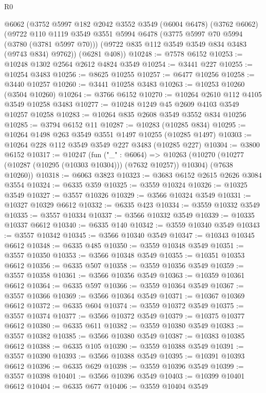 \begin{lexlean}{R0}
\begin{coremodule}
    @6062
    (@3752
      @5997
      @182
      @2042
      @3552
      @3549
      (@6004 @6478)
      (@3762 @6062)
      (@9722
        @110
        @1119
        @3549
        @3551
        @5994
        @6478
        (@3775 @5997 @70 @5994 (@3780 (@3781 @5997 @70)))
        (@9722 @835 @112 @3549 @3549 @834 @3483 (@9743 @834) @9762))
      (@6281 @408))
@10248 := @7578 @6152
@10253 := @10248 @1302 @2564 @2612 @4824 @3549
@10254 := @3441 @227
@10255 := @10254 @3483
@10256 := @8625 @10255
@10257 := @6477 @10256
@10258 := @3440 @10257
@10260 := @3441 @10258 @3483
@10263 := @10253 @10260 (@3504 @10260)
@10264 := @3766 @6152
@10270 := @10264 @2610 @112 @4105 @3549 @10258 @3483
@10277 := @10248 @1249 @45 @2609 @4103 @3549 @10257 @10258
@10283 := @10264 @835 @2608 @3549 @3552 @834 @10256
@10285 := @3794 @6152 @11
@10287 := @10283 (@10285 @834)
@10295 := @10264 @1498 @263 @3549 @3551 @1497 @10255 (@10285 @1497)
@10303 := @10264 @228 @112 @3549 @3549 @227 @3483 (@10285 @227)
@10304 := @3800 @6152
@10317 := @10247
    (fun ("_" : @6064) =>
    @10263 (@10270 (@10277 (@10287 (@10295 (@10303 @10304))) (@7632 @10257)) @10304) (@7638 @10260))
@10318 := @6063 @3823
@10323 := @3683 @6152 @2615 @2626 @3084 @3554
@10324 := @6335 @359
@10325 := @3559 @10324
@10326 := @10325 @3549
@10327 := @3557 @10326
@10329 := @3566 @10324 @3549
@10331 := @10327 @10329 @6612
@10332 := @6335 @423
@10334 := @3559 @10332 @3549
@10335 := @3557 @10334
@10337 := @3566 @10332 @3549
@10339 := @10335 @10337 @6612
@10340 := @6335 @140
@10342 := @3559 @10340 @3549
@10343 := @3557 @10342
@10345 := @3566 @10340 @3549
@10347 := @10343 @10345 @6612
@10348 := @6335 @485
@10350 := @3559 @10348 @3549
@10351 := @3557 @10350
@10353 := @3566 @10348 @3549
@10355 := @10351 @10353 @6612
@10356 := @6335 @507
@10358 := @3559 @10356 @3549
@10359 := @3557 @10358
@10361 := @3566 @10356 @3549
@10363 := @10359 @10361 @6612
@10364 := @6335 @597
@10366 := @3559 @10364 @3549
@10367 := @3557 @10366
@10369 := @3566 @10364 @3549
@10371 := @10367 @10369 @6612
@10372 := @6335 @604
@10374 := @3559 @10372 @3549
@10375 := @3557 @10374
@10377 := @3566 @10372 @3549
@10379 := @10375 @10377 @6612
@10380 := @6335 @611
@10382 := @3559 @10380 @3549
@10383 := @3557 @10382
@10385 := @3566 @10380 @3549
@10387 := @10383 @10385 @6612
@10388 := @6335 @105
@10390 := @3559 @10388 @3549
@10391 := @3557 @10390
@10393 := @3566 @10388 @3549
@10395 := @10391 @10393 @6612
@10396 := @6335 @629
@10398 := @3559 @10396 @3549
@10399 := @3557 @10398
@10401 := @3566 @10396 @3549
@10403 := @10399 @10401 @6612
@10404 := @6335 @677
@10406 := @3559 @10404 @3549

\end{coremodule}
\end{lexlean}
